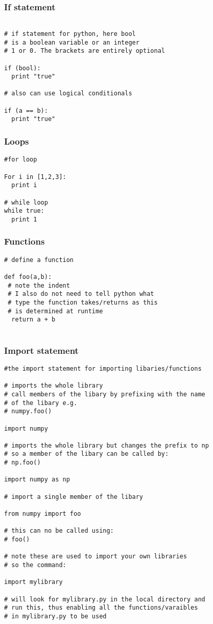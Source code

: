 \documentclass[11pt,a4paper]{article}
\begin{document}
\subsubsection{If statement}
\begin{verbatim}

# if statement for python, here bool
# is a boolean variable or an integer
# 1 or 0. The brackets are entirely optional

if (bool):
  print "true"

# also can use logical conditionals

if (a == b):
  print "true"

\end{verbatim}


\subsubsection{Loops}
\begin{verbatim}
#for loop

For i in [1,2,3]:
  print i 

# while loop
while true:
  print 1
\end{verbatim}

\subsubsection{Functions}
\begin{verbatim}
# define a function

def foo(a,b):
 # note the indent
 # I also do not need to tell python what
 # type the function takes/returns as this
 # is determined at runtime
  return a + b 
  
\end{verbatim}

\subsubsection{Import statement}
\begin{verbatim}
#the import statement for importing libaries/functions

# imports the whole library
# call members of the libary by prefixing with the name
# of the libary e.g.
# numpy.foo()

import numpy

# imports the whole library but changes the prefix to np
# so a member of the libary can be called by:
# np.foo()
 
import numpy as np

# import a single member of the libary

from numpy import foo

# this can no be called using:
# foo()

# note these are used to import your own libraries
# so the command:

import mylibrary

# will look for mylibrary.py in the local directory and 
# run this, thus enabling all the functions/varaibles
# in mylibrary.py to be used

\end{verbatim}
\end{document}
